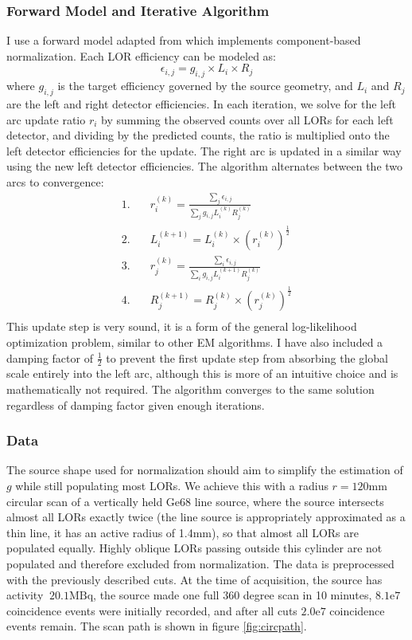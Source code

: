 \documentclass{article}
\begin{document}
\subsubsection{Forward Model and Iterative Algorithm}
I use a forward model adapted from \cite{componentbasednormalization} which implements component-based normalization. Each LOR efficiency can be modeled as:
\[\epsilon_{i, j} = g_{i,j} \times L_{i} \times R_{j}\]
where $g_{i,j}$ is the target efficiency governed by the source geometry, and $L_{i}$ and $R_{j}$ are the left and right detector efficiencies. In each iteration, we solve for the left arc update ratio $r_i$ by summing the observed counts over all LORs for each left detector, and dividing by the predicted counts, the ratio is multiplied onto the left detector efficiencies for the update. The right arc is updated in a similar way using the new left detector efficiencies. The algorithm alternates between the two arcs to convergence:
\begin{align*}
    1.\quad& r_i^{(k)} = \frac{\sum_j \epsilon_{i, j}}{\sum_j g_{i, j}L_i^{(k)}R_j^{(k)}} \\
    2.\quad& L_{i}^{(k+1)} = L_{i}^{(k)} \times (r_i^{(k)})^{\frac12} \\
    3.\quad& r_j^{(k)} = \frac{\sum_i \epsilon_{i, j}}{\sum_i g_{i, j}L_i^{(k+1)}R_j^{(k)}} \\
    4.\quad& R_{j}^{(k+1)} = R_{j}^{(k)} \times (r_j^{(k)})^{\frac12} \\
\end{align*}
This update step is very sound, it is a form of the general log-likelihood optimization problem, similar to other EM algorithms. I have also included a damping factor of $\frac12$ to prevent the first update step from absorbing the global scale entirely into the left arc, although this is more of an intuitive choice and is mathematically not required. The algorithm converges to the same solution regardless of damping factor given enough iterations.
\newpage
\subsubsection{Data}
The source shape used for normalization should aim to simplify the estimation of $g$ while still populating most LORs. We achieve this with a radius $r=120\text{mm}$ circular scan of a vertically held Ge68 line source, where the source intersects almost all LORs exactly twice (the line source is appropriately approximated as a thin line, it has an active radius of 1.4mm), so that almost all LORs are populated equally. Highly oblique LORs passing outside this cylinder are not populated and therefore excluded from normalization. The data is preprocessed with the previously described cuts. At the time of acquisition, the source has activity $~20.1\text{MBq}$, the source made one full 360 degree scan in 10 minutes, $8.1\text{e}7$ coincidence events were initially recorded, and after all cuts $2.0\text{e}7$ coincidence events remain. The scan path is shown in figure \ref{fig:circpath}.
\end{document}
